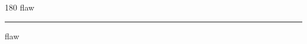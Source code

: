 
\begin{frame}
\begin{center}
\begin{turn}{180}
{\fontsize{2.5cm}{1em}\selectfont flaw}
\end{turn}
\vspace{1em}\par  
\hrule
\vspace{1em}\par  
{\fontsize{2.5cm}{1em}\selectfont flaw}
\end{center}
\end{frame}
